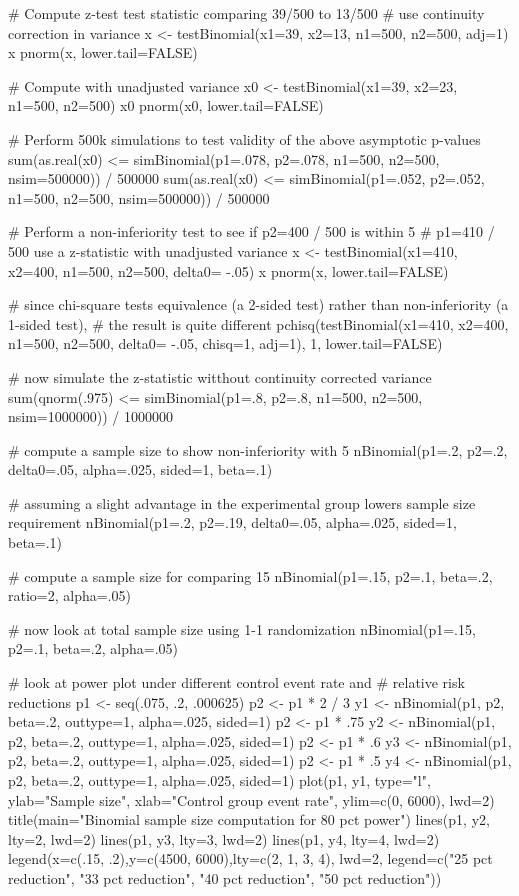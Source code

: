 \begin{Examples}
\begin{ExampleCode}
# Compute z-test test statistic comparing 39/500 to 13/500
# use continuity correction in variance
x <- testBinomial(x1=39, x2=13, n1=500, n2=500, adj=1)
x
pnorm(x, lower.tail=FALSE)

# Compute with unadjusted variance
x0 <- testBinomial(x1=39, x2=23, n1=500, n2=500)
x0
pnorm(x0, lower.tail=FALSE)

# Perform 500k simulations to test validity of the above asymptotic p-values 
sum(as.real(x0) <= simBinomial(p1=.078, p2=.078, n1=500, n2=500, nsim=500000)) / 500000
sum(as.real(x0) <= simBinomial(p1=.052, p2=.052, n1=500, n2=500, nsim=500000)) / 500000

# Perform a non-inferiority test to see if p2=400 / 500 is within 5
# p1=410 / 500 use a z-statistic with unadjusted variance
x <- testBinomial(x1=410, x2=400, n1=500, n2=500, delta0= -.05)
x
pnorm(x, lower.tail=FALSE)

# since chi-square tests equivalence (a 2-sided test) rather than non-inferiority (a 1-sided test), 
# the result is quite different
pchisq(testBinomial(x1=410, x2=400, n1=500, n2=500, delta0= -.05, chisq=1, 
                    adj=1), 1, lower.tail=FALSE)

# now simulate the z-statistic witthout continuity corrected variance
sum(qnorm(.975) <= simBinomial(p1=.8, p2=.8, n1=500, n2=500, nsim=1000000)) / 1000000

# compute a sample size to show non-inferiority with 5
nBinomial(p1=.2, p2=.2, delta0=.05, alpha=.025, sided=1, beta=.1)

# assuming a slight advantage in the experimental group lowers sample size requirement
nBinomial(p1=.2, p2=.19, delta0=.05, alpha=.025, sided=1, beta=.1)

# compute a sample size for comparing 15%
nBinomial(p1=.15, p2=.1, beta=.2, ratio=2, alpha=.05)

# now look at total sample size using 1-1 randomization
nBinomial(p1=.15, p2=.1, beta=.2, alpha=.05)

# look at power plot under different control event rate and
# relative risk reductions
p1 <- seq(.075, .2, .000625)
p2 <- p1 * 2 / 3
y1 <- nBinomial(p1, p2, beta=.2, outtype=1, alpha=.025, sided=1)
p2 <- p1 * .75
y2 <- nBinomial(p1, p2, beta=.2, outtype=1, alpha=.025, sided=1)
p2 <- p1 * .6
y3 <- nBinomial(p1, p2, beta=.2, outtype=1, alpha=.025, sided=1)
p2 <- p1 * .5
y4 <- nBinomial(p1, p2, beta=.2, outtype=1, alpha=.025, sided=1)
plot(p1, y1, type="l", ylab="Sample size", xlab="Control group event rate",
     ylim=c(0, 6000), lwd=2)
title(main="Binomial sample size computation for 80 pct power")
lines(p1, y2, lty=2, lwd=2)
lines(p1, y3, lty=3, lwd=2)
lines(p1, y4, lty=4, lwd=2)
legend(x=c(.15, .2),y=c(4500, 6000),lty=c(2, 1, 3, 4), lwd=2,
       legend=c("25 pct reduction", "33 pct reduction", "40 pct reduction",
                "50 pct reduction"))
\end{ExampleCode}
\end{Examples}

